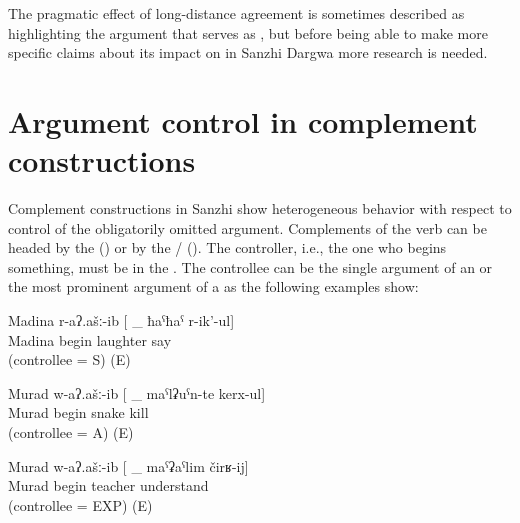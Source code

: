 The pragmatic effect of long-distance agreement is sometimes described as highlighting the argument that serves as , but before being able to make more specific claims about its impact on  in Sanzhi Dargwa more research is needed. 



\section{Argument control in complement constructions}
\label{sec:Argument control in complement constructions}

Complement constructions in Sanzhi show heterogeneous behavior with respect to control of the obligatorily omitted argument. Complements of the verb   can be headed by the  () or by the \slash {} (). The controller, i.e., the one who begins something, must be in the . The controllee can be the single argument of an  or the most prominent argument of a  as the following examples show:
%
\begin{exe}
	\ex	\label{ex:Madina, Murad, snakes, teacher@42}
	\begin{xlist}
		\ex	\label{ex:Madina began to laugh@42a}
		\gll	Madina	r-aʔ.ašː-ib	[ \_	ħaˁħaˁ	r-ik'-ul]\\
			Madina	begin	{} 		laughter	say\\
		\glt	{} (controllee = S) (E)

		\ex	\label{ex:Murad began to kill snakes@42b}
		\gll	Murad	w-aʔ.ašː-ib	[ \_	maˁlʡuˁn-te	kerx-ul]\\
			Murad	begin	{} 	snake	kill\\
		\glt	{} (controllee = A) (E)

		\ex	\label{ex:Murad began to understand the teacher@42c}
		\gll	Murad	w-aʔ.ašː-ib	[ \_	maˁʡaˁlim	čirʁ-ij]\\
			Murad	begin	{} 	teacher	understand\\
		\glt	{} (controllee = EXP) (E)
	\end{xlist}
\end{exe}

